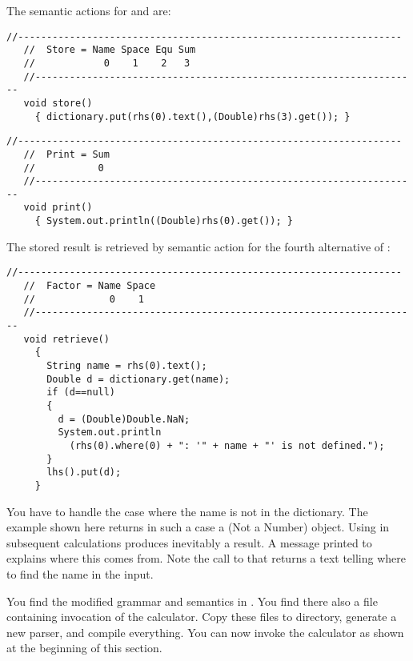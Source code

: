 The semantic actions for  and  are:

\small
\begin{Verbatim}[frame=single,framesep=2mm,samepage=true,xleftmargin=15mm,xrightmargin=15mm,baselinestretch=0.8]
   //-------------------------------------------------------------------
   //  Store = Name Space Equ Sum
   //            0    1    2   3
   //-------------------------------------------------------------------
   void store()
     { dictionary.put(rhs(0).text(),(Double)rhs(3).get()); }
\end{Verbatim}
\normalsize

\small
\begin{Verbatim}[frame=single,framesep=2mm,samepage=true,xleftmargin=15mm,xrightmargin=15mm,baselinestretch=0.8]
   //-------------------------------------------------------------------
   //  Print = Sum
   //           0
   //-------------------------------------------------------------------
   void print()
     { System.out.println((Double)rhs(0).get()); }
\end{Verbatim}
\normalsize

The stored result is retrieved by semantic action
for the fourth alternative of :

\small
\begin{Verbatim}[frame=single,framesep=2mm,samepage=true,xleftmargin=15mm,xrightmargin=15mm,baselinestretch=0.8]
   //-------------------------------------------------------------------
   //  Factor = Name Space
   //             0    1
   //-------------------------------------------------------------------
   void retrieve()
     {
       String name = rhs(0).text();
       Double d = dictionary.get(name);
       if (d==null)
       {
         d = (Double)Double.NaN;
         System.out.println
           (rhs(0).where(0) + ": '" + name + "' is not defined.");
       }
       lhs().put(d);
     }
\end{Verbatim}
\normalsize

You have to handle the case where the name is not in the dictionary.
The example shown here returns in such a case a  (Not a Number) object. 
Using  in subsequent calculations produces inevitably a  result.
A message printed to  explains where this  comes from.
Note the call to  that returns a text telling where to find the name
in the input. 

You find the modified grammar and semantics in .
You find there also a file  containing invocation of the calculator.
Copy these files to  directory, generate a new parser, and compile
everything.
You can now invoke the calculator as shown at the beginning of this section.
